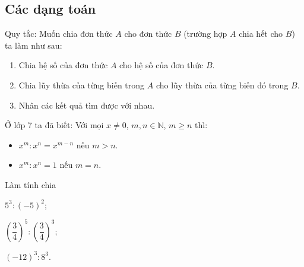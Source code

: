 \subsection{Các dạng toán}
\begin{dang}
	Quy tắc: Muốn chia đơn thức $A$ cho đơn thức $B$ (trường hợp $A$ chia hết cho $B$) ta làm như sau:
	\begin{enumerate}[\tickEX]
		\item Chia hệ số của đơn thức $A$ cho hệ số của đơn thức $B$.
		\item Chia lũy thừa của từng biến trong $A$ cho lũy thừa của từng biến đó trong $B$.
		\item Nhân các kết quả tìm được với nhau.
	\end{enumerate}
\begin{note}
	Ở lớp 7 ta đã biết: Với mọi $x\ne0$, $m,n\in\mathbb{N}$, $m\geq n$ thì:
	\begin{itemize}
		\item $x^m:x^n=x^{m-n}$ nếu $m>n$.
		\item $x^m:x^n=1$ nếu $m=n$.
	\end{itemize}
\end{note}
\end{dang}
\begin{vd}
	Làm tính chia
\begin{listEX}[3]
	\item $5^3:(-5)^2$;
	\item $\left(\dfrac{3}{4}\right)^5:\left(\dfrac{3}{4}\right)^3$;
	\item $(-12)^3:8^3$.
\end{listEX}

\end{vd}
